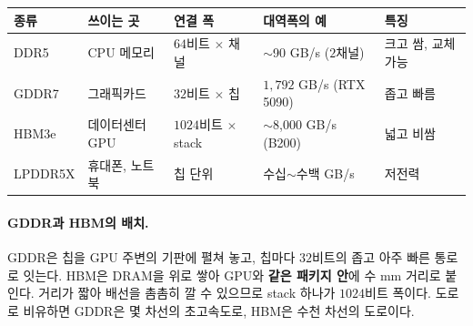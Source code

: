 \documentclass[11pt,a4paper]{article}
\begin{document}
\begin{center}
{\small
\begin{tabular}{@{}lllll@{}}
\toprule
종류 & 쓰이는 곳 & 연결 폭 & 대역폭의 예 & 특징 \\
\midrule
DDR5 & CPU 메모리 & $64$비트 $\times$ 채널 & $\sim$90 GB/s ($2$채널) & 크고 쌈, 교체 가능 \\
GDDR7 & 그래픽카드 & $32$비트 $\times$ 칩 & $1{,}792$ GB/s (RTX 5090) & 좁고 빠름 \\
HBM3e & 데이터센터 GPU & $1024$비트 $\times$ stack & $\sim$8,000 GB/s (B200) & 넓고 비쌈 \\
LPDDR5X & 휴대폰, 노트북 & 칩 단위 & 수십$\sim$수백 GB/s & 저전력 \\
\bottomrule
\end{tabular}}
\end{center}

\paragraph{GDDR과 HBM의 배치.}
GDDR은 칩을 GPU 주변의 기판에 펼쳐 놓고, 칩마다 $32$비트의 좁고 아주 빠른 통로로 잇는다.
HBM은 DRAM을 위로 쌓아 GPU와 \textbf{같은 패키지 안}에 수 mm 거리로 붙인다. 거리가 짧아 배선을 촘촘히 깔 수 있으므로 stack 하나가 $1024$비트 폭이다.
도로로 비유하면 GDDR은 몇 차선의 초고속도로, HBM은 수천 차선의 도로이다.
\end{document}
